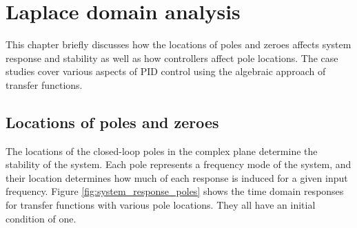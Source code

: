 
\chapter{Laplace domain analysis}

This chapter briefly discusses how the locations of poles and zeroes affects
system response and stability as well as how controllers affect pole locations.
The case studies cover various aspects of PID control using the algebraic
approach of transfer functions.

\section{Locations of poles and zeroes}

The locations of the closed-loop poles in the complex plane determine the
stability of the \gls{system}. Each pole represents a frequency mode of the
\gls{system}, and their location determines how much of each response is induced
for a given input frequency. Figure \ref{fig:system_response_poles} shows the
time domain responses for transfer functions with various pole locations. They
all have an initial condition of one.


